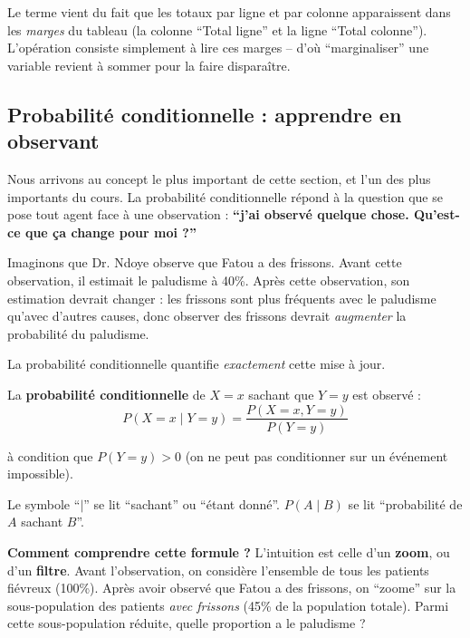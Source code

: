 \documentclass[11pt,a4paper]{article}
\begin{document}
\begin{attentionbox}
Le terme vient du fait que les totaux par ligne et par colonne apparaissent dans les \textit{marges} du tableau (la colonne ``Total ligne'' et la ligne ``Total colonne''). L'opération consiste simplement à lire ces marges -- d'où ``marginaliser'' une variable revient à sommer pour la faire disparaître.
\end{attentionbox}

\subsection{Probabilité conditionnelle : apprendre en observant}

Nous arrivons au concept le plus important de cette section, et l'un des plus importants du cours. La probabilité conditionnelle répond à la question que se pose tout agent face à une observation : \textbf{``j'ai observé quelque chose. Qu'est-ce que ça change pour moi ?''}

Imaginons que Dr. Ndoye observe que Fatou a des frissons. Avant cette observation, il estimait le paludisme à 40\%. Après cette observation, son estimation devrait changer : les frissons sont plus fréquents avec le paludisme qu'avec d'autres causes, donc observer des frissons devrait \textit{augmenter} la probabilité du paludisme.

La probabilité conditionnelle quantifie \textit{exactement} cette mise à jour.

\begin{definitionbox}
La \textbf{probabilité conditionnelle} de $X = x$ sachant que $Y = y$ est observé :
$$P(X = x \mid Y = y) = \frac{P(X = x, Y = y)}{P(Y = y)}$$

à condition que $P(Y = y) > 0$ (on ne peut pas conditionner sur un événement impossible).

Le symbole ``$\mid$'' se lit ``sachant'' ou ``étant donné''. $P(A \mid B)$ se lit ``probabilité de $A$ sachant $B$''.
\end{definitionbox}

\textbf{Comment comprendre cette formule ?} L'intuition est celle d'un \textbf{zoom}, ou d'un \textbf{filtre}. Avant l'observation, on considère l'ensemble de tous les patients fiévreux (100\%). Après avoir observé que Fatou a des frissons, on ``zoome'' sur la sous-population des patients \textit{avec frissons} (45\% de la population totale). Parmi cette sous-population réduite, quelle proportion a le paludisme ?
\end{document}
